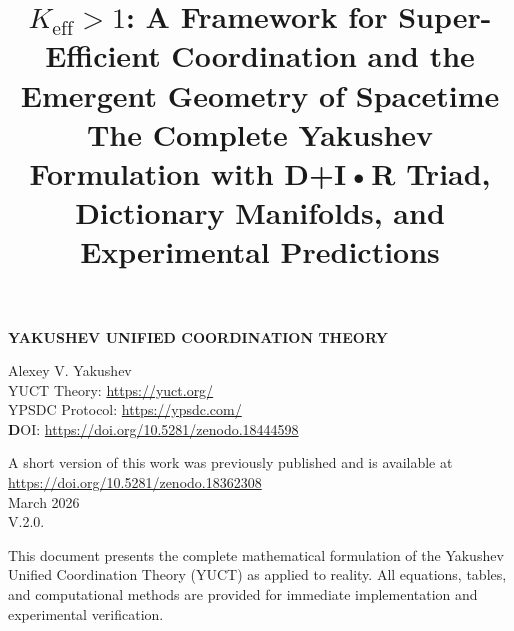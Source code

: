 \documentclass[11pt,a4paper]{article}
\title{$K_{\mathrm{eff}} > 1$: A Framework for Super-Efficient Coordination and the Emergent Geometry of Spacetime \\ 
	\large The Complete Yakushev Formulation with D+I•R Triad, Dictionary Manifolds, and Experimental Predictions}
\begin{document}
\begin{titlepage}
	\begin{center}
		\vspace*{3cm}
		\Huge\textbf{YAKUSHEV UNIFIED COORDINATION THEORY\\
		}
		
		
		
		\vspace{2cm}
		\Large
		Alexey V. Yakushev\\
		\vspace{2cm}
	YUCT Theory: \url{https://yuct.org/}\\
YPSDC Protocol: \url{https://ypsdc.com/}\\


\vspace{2cm}
\textbf DOI: \url{https://doi.org/10.5281/zenodo.18444598}\\

\vspace{1cm}

\vspace{0cm}
\large 
A short version of this work was previously published and is available at\\ \url{https://doi.org/10.5281/zenodo.18362308}\\
\vspace{1cm}
March 2026 \\ \large V.2.0.
		
		\vfill
		\normalsize
		This document presents the complete mathematical formulation of the Yakushev Unified Coordination Theory (YUCT) as applied to reality. All equations, tables, and computational methods are provided for immediate implementation and experimental verification.
	\end{center}
\end{titlepage}

	
	
	\maketitle
	
\end{document}
